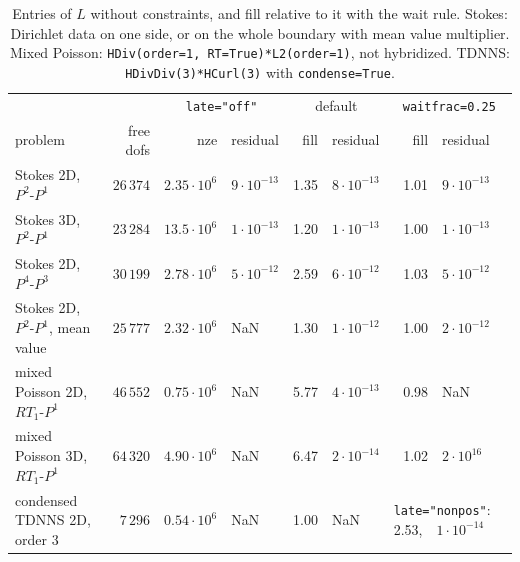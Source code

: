 \documentclass[10pt,a4paper]{article}
\newcommand{\code}[1]{\texttt{#1}}
\begin{document}
\begin{table}[h]\centering\small\setlength{\tabcolsep}{5pt}
\begin{tabular}{@{}lr rl rl rl@{}}\toprule
 & & \multicolumn{2}{c}{\code{late="off"}} & \multicolumn{2}{c}{default} & \multicolumn{2}{c}{\code{waitfrac=0.25}}\\
 problem & free dofs & nze & residual & fill & residual & fill & residual\\\midrule
 Stokes 2D, $P^2$-$P^1$                & $26\,374$ & $2.35\cdot10^6$ & $9\cdot10^{-13}$ & 1.35 & $8\cdot10^{-13}$ & 1.01 & $9\cdot10^{-13}$\\
 Stokes 3D, $P^2$-$P^1$                & $23\,284$ & $13.5\cdot10^6$ & $1\cdot10^{-13}$ & 1.20 & $1\cdot10^{-13}$ & 1.00 & $1\cdot10^{-13}$\\
 Stokes 2D, $P^4$-$P^3$                & $30\,199$ & $2.78\cdot10^6$ & $5\cdot10^{-12}$ & 2.59 & $6\cdot10^{-12}$ & 1.03 & $5\cdot10^{-12}$\\
 Stokes 2D, $P^2$-$P^1$, mean value    & $25\,777$ & $2.32\cdot10^6$ & NaN              & 1.30 & $1\cdot10^{-12}$ & 1.00 & $2\cdot10^{-12}$\\
 mixed Poisson 2D, $RT_1$-$P^1$        & $46\,552$ & $0.75\cdot10^6$ & NaN              & 5.77 & $4\cdot10^{-13}$ & 0.98 & NaN\\
 mixed Poisson 3D, $RT_1$-$P^1$        & $64\,320$ & $4.90\cdot10^6$ & NaN              & 6.47 & $2\cdot10^{-14}$ & 1.02 & $2\cdot10^{16}$\\\midrule
 condensed TDNNS 2D, order 3           & $7\,296$  & $0.54\cdot10^6$ & NaN              & 1.00 & NaN              & \multicolumn{2}{l}{\code{late="nonpos"}: 2.53,\ \ $1\cdot10^{-14}$}\\\bottomrule
\end{tabular}
\caption{Entries of $L$ without constraints, and fill relative to it with the wait rule. Stokes: Dirichlet data on one side, or on the whole boundary with mean value multiplier. Mixed Poisson: \code{HDiv(order=1, RT=True)*L2(order=1)}, not hybridized. TDNNS: \code{HDivDiv(3)*HCurl(3)} with \code{condense=True}.}\label{tab:fill}
\end{table}
\end{document}
